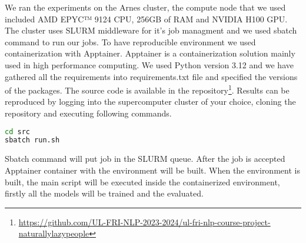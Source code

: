 We ran the experiments on the Arnes cluster, the compute node that we used included AMD EPYC™ 9124 CPU, 256GB of RAM and NVIDIA H100 GPU. The cluster uses SLURM middleware for it's job managment and we used sbatch command to run our jobs. To have reproducible environment we used containerization with Apptainer. Apptainer is a containerization solution mainly used in high performance computing. We used Python version 3.12 and we have gathered all the requirements into requirements.txt file and specified the versions of the packages. The source code is available in the repository\footnote{\url{https://github.com/UL-FRI-NLP-2023-2024/ul-fri-nlp-course-project-naturallylazypeople}}. Results can be reproduced by logging into the supercomputer cluster of your choice, cloning the repository and executing following commands.

\begin{lstlisting}[language=bash,caption={Commands for running the training and evaluation}]
cd src
sbatch run.sh
\end{lstlisting}

Sbatch command will put job in the SLURM queue. After the job is accepted Apptainer container with the environment will be built. When the environment is built, the main script will be executed inside the containerized environment, firstly all the models will be trained and the evaluated.


